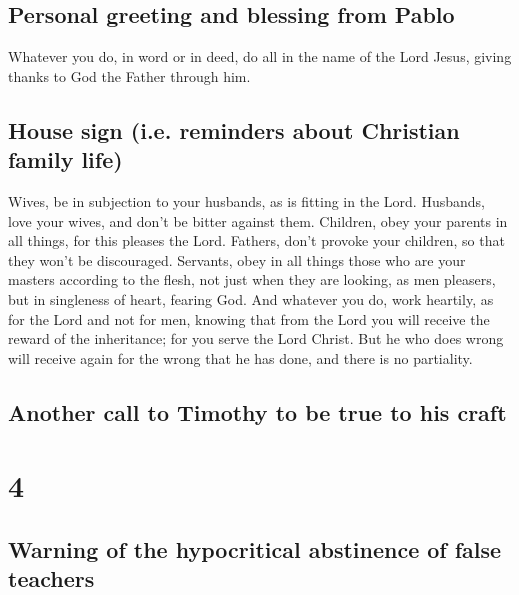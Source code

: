 \hypertarget{personal-greeting-and-blessing-from-pablo}{%
\subsection{Personal greeting and blessing from
Pablo}\label{personal-greeting-and-blessing-from-pablo}}

 Whatever you do, in word or in deed, do all in the name
of the Lord Jesus, giving thanks to God the Father through him.

\hypertarget{house-sign-i.e.-reminders-about-christian-family-life}{%
\subsection{House sign (i.e. reminders about Christian family
life)}\label{house-sign-i.e.-reminders-about-christian-family-life}}

 Wives, be in subjection to your husbands, as is fitting
in the Lord.  Husbands, love your wives, and don't be
bitter against them.  Children, obey your parents in all
things, for this pleases the Lord.  Fathers, don't
provoke your children, so that they won't be discouraged.
 Servants, obey in all things those who are your masters
according to the flesh, not just when they are looking, as men pleasers,
but in singleness of heart, fearing God.  And whatever
you do, work heartily, as for the Lord and not for men, 
knowing that from the Lord you will receive the reward of the
inheritance; for you serve the Lord Christ.  But he who
does wrong will receive again for the wrong that he has done, and there
is no partiality.

\hypertarget{another-call-to-timothy-to-be-true-to-his-craft}{%
\subsection{Another call to Timothy to be true to his
craft}\label{another-call-to-timothy-to-be-true-to-his-craft}}

\hypertarget{section-3}{%
\section{4}\label{section-3}}

\hypertarget{warning-of-the-hypocritical-abstinence-of-false-teachers}{%
\subsection{Warning of the hypocritical abstinence of false
teachers}\label{warning-of-the-hypocritical-abstinence-of-false-teachers}}

